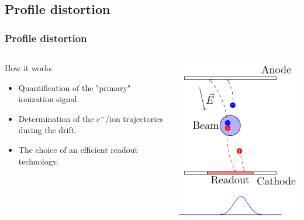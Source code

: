 \subsection{Profile distortion}
\begin{frame}
  \frametitle{Profile distortion}
  \begin{columns}
    \begin{column}{0.45\textwidth}
      \begin{block}{How it works}
        \begin{itemize}
          \item Quantification of the "primary" ionization signal.
          \item Determination of the $e^-$/ion trajectories during the drift.
          \item The choice of an efficient readout technology.
        \end{itemize}
      \end{block}
    \end{column}
    \begin{column}{0.45\textwidth}
      \includegraphics[width=\textwidth]{03_SIM/fig/fig000_IPM_distorsion.pdf}
    \end{column}
  \end{columns}
\end{frame}

